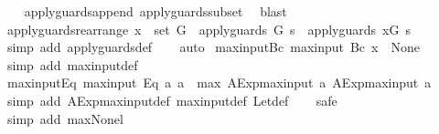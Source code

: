 \begin{isabellebody}
%
\isadelimproof
\ \ %
\endisadelimproof
%
\isatagproof
{}\isamarkupfalse%
\ apply{\isacharunderscore}guards{\isacharunderscore}append\ apply{\isacharunderscore}guards{\isacharunderscore}subset\ \isamarkupfalse%
\ blast%
\endisatagproof
{\isafoldproof}%
%
\isadelimproof
\isanewline
%
\endisadelimproof
\isanewline
{}\isamarkupfalse%
\ apply{\isacharunderscore}guards{\isacharunderscore}rearrange{\isacharcolon}\ {\isachardoublequoteopen}x\ {\isasymin}\ set\ G\ {\isasymLongrightarrow}\ apply{\isacharunderscore}guards\ G\ s\ {\isacharequal}\ apply{\isacharunderscore}guards\ {\isacharparenleft}x{\isacharhash}G{\isacharparenright}\ s{\isachardoublequoteclose}\isanewline
%
\isadelimproof
\ \ %
\endisadelimproof
%
\isatagproof
{}\isamarkupfalse%
\ {\isacharparenleft}simp\ add{\isacharcolon}\ apply{\isacharunderscore}guards{\isacharunderscore}def{\isacharparenright}\isanewline
\ \ \isamarkupfalse%
\ auto%
\endisatagproof
{\isafoldproof}%
%
\isadelimproof
\isanewline
%
\endisadelimproof
\isanewline
{}\isamarkupfalse%
\ max{\isacharunderscore}input{\isacharunderscore}Bc{\isacharcolon}\ {\isachardoublequoteopen}max{\isacharunderscore}input\ {\isacharparenleft}Bc\ x{\isacharparenright}\ {\isacharequal}\ None{\isachardoublequoteclose}\isanewline
%
\isadelimproof
\ \ %
\endisadelimproof
%
\isatagproof
{}\isamarkupfalse%
\ {\isacharparenleft}simp\ add{\isacharcolon}\ max{\isacharunderscore}input{\isacharunderscore}def{\isacharparenright}%
\endisatagproof
{\isafoldproof}%
%
\isadelimproof
\isanewline
%
\endisadelimproof
\isanewline
{}\isamarkupfalse%
\ max{\isacharunderscore}input{\isacharunderscore}Eq{\isacharcolon}\ {\isachardoublequoteopen}max{\isacharunderscore}input\ {\isacharparenleft}Eq\ a{}\ a{}{\isacharparenright}\ {\isacharequal}\ max\ {\isacharparenleft}AExp{\isachardot}max{\isacharunderscore}input\ a{}{\isacharparenright}\ {\isacharparenleft}AExp{\isachardot}max{\isacharunderscore}input\ a{}{\isacharparenright}{\isachardoublequoteclose}\isanewline
%
\isadelimproof
\ \ %
\endisadelimproof
%
\isatagproof
{}\isamarkupfalse%
\ {\isacharparenleft}simp\ add{\isacharcolon}\ AExp{\isachardot}max{\isacharunderscore}input{\isacharunderscore}def\ max{\isacharunderscore}input{\isacharunderscore}def\ Let{\isacharunderscore}def{\isacharparenright}\isanewline
\ \ \isamarkupfalse%
\ safe\isanewline
\ \ \ \ \isamarkupfalse%
\ {\isacharparenleft}simp\ add{\isacharcolon}\ max{\isacharunderscore}None{\isacharunderscore}l{\isacharparenright}\isanewline

\end{isabellebody}
